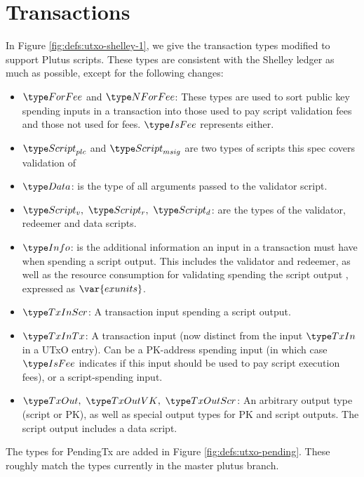 \section{Transactions}
\label{sec:transactions}

In Figure \ref{fig:defs:utxo-shelley-1}, we give the transaction types modified
to support Plutus scripts. These types are consistent with the Shelley ledger
as much as possible,
except for the following changes:

\begin{itemize}
  \item $\ForFee$ and $\NForFee$: These types are used to sort public key
  spending inputs in a transaction into those used to pay script validation
  fees and those not used
  for fees. $\IsFee$ represents either.

  \item $\ScriptPlutus$ and $\ScriptMSig$ are two types of scripts this spec
  covers validation of

  \item $\Data$: is the type of all arguments passed to the validator script.

  \item $\ScriptV,~ \ScriptR,~ \ScriptD$: are the types of the validator,
  redeemer and data scripts.

  \item $\Info$: is the additional information an input in a transaction must
  have when spending a script output. This includes the validator and redeemer,
  as well as the resource consumption for validating spending the script output
  , expressed as $\var{exunits}$.

  \item $\TxInScr$: A transaction input spending a script output.

  \item $\TxInTx$: A transaction input (now distinct from the input $\TxIn$ in
  a UTxO entry). Can be a PK-address spending input
  (in which case $\IsFee$ indicates if this input should be used to pay script execution
  fees), or a script-spending input.

  \item $\TxOut,~\TxOutVK,~\TxOutScr$: An arbitrary output type (script or PK),
  as well as special output types for PK and script outputs. The script output
  includes a data script.
\end{itemize}

The types for PendingTx are added in Figure \ref{fig:defs:utxo-pending}.
These roughly match the types currently in the master plutus branch.


